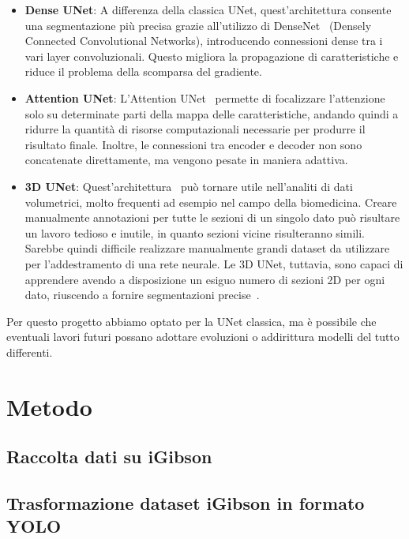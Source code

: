 \documentclass[12pt]{report}
\begin{document}
\begin{itemize}
	\item \textbf{Dense UNet}: A differenza della classica UNet, quest'architettura consente una segmentazione più precisa grazie all'utilizzo di DenseNet~\cite{8296389} (Densely Connected Convolutional Networks), introducendo connessioni dense tra i vari layer convoluzionali. Questo migliora la propagazione di caratteristiche e riduce il problema della scomparsa del gradiente.
	\item \textbf{Attention UNet}: L'Attention UNet~\cite{oktay2018attentionunetlearninglook} permette di focalizzare l'attenzione solo su determinate parti della mappa delle caratteristiche, andando quindi a ridurre la quantità di risorse computazionali necessarie per produrre il risultato finale. Inoltre, le connessioni tra encoder e decoder non sono concatenate direttamente, ma vengono pesate in maniera adattiva.
	\item \textbf{3D UNet}: Quest'architettura~\cite{çiçek20163dunetlearningdense} può tornare utile nell'analiti di dati volumetrici, molto frequenti ad esempio nel campo della biomedicina. Creare manualmente annotazioni per tutte le sezioni di un singolo dato può risultare un lavoro tedioso e inutile, in quanto sezioni vicine risulteranno simili. Sarebbe quindi difficile realizzare manualmente grandi dataset da utilizzare per l'addestramento di una rete neurale. Le 3D UNet, tuttavia, sono capaci di apprendere avendo a disposizione un esiguo numero di sezioni 2D per ogni dato, riuscendo a fornire segmentazioni precise~\cite{çiçek20163dunetlearningdense}.
\end{itemize}

Per questo progetto abbiamo optato per la UNet classica, ma è possibile che eventuali lavori futuri possano adottare evoluzioni o addirittura modelli del tutto differenti.





\chapter{Metodo}
\label{chap:metodo}

\section{Raccolta dati su iGibson}
\label{chap:raccolta_dati_igibson}

\section{Trasformazione dataset iGibson in formato YOLO}
\label{chap:dataset_igibson_yolo}
\end{document}
